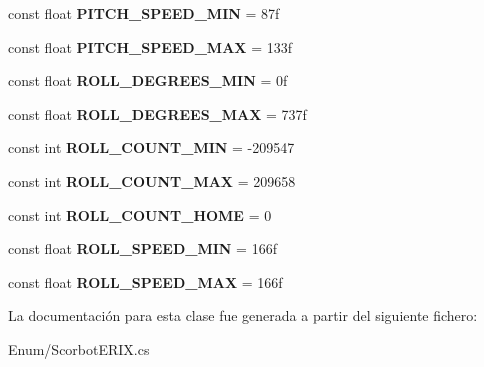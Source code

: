 \begin{DoxyCompactItemize}
const float {\bfseries P\+I\+T\+C\+H\+\_\+\+S\+P\+E\+E\+D\+\_\+\+M\+IN} = 87f
\item 
\mbox{\label{class_scorbot_e_r_i_x_a5ca94c84b6cd6544a714c421b3aba5fb}} 
const float {\bfseries P\+I\+T\+C\+H\+\_\+\+S\+P\+E\+E\+D\+\_\+\+M\+AX} = 133f
\item 
\mbox{\label{class_scorbot_e_r_i_x_accf0e376abade49acc20a535de2f1c8f}} 
const float {\bfseries R\+O\+L\+L\+\_\+\+D\+E\+G\+R\+E\+E\+S\+\_\+\+M\+IN} = 0f
\item 
\mbox{\label{class_scorbot_e_r_i_x_a57eb1a952954a936ef9c3c9032762078}} 
const float {\bfseries R\+O\+L\+L\+\_\+\+D\+E\+G\+R\+E\+E\+S\+\_\+\+M\+AX} = 737f
\item 
\mbox{\label{class_scorbot_e_r_i_x_aa8eafd3a427f306fceaa8a251f46ca8f}} 
const int {\bfseries R\+O\+L\+L\+\_\+\+C\+O\+U\+N\+T\+\_\+\+M\+IN} = -\/209547
\item 
\mbox{\label{class_scorbot_e_r_i_x_a2e0e51d09505d42702c453484ee4b87e}} 
const int {\bfseries R\+O\+L\+L\+\_\+\+C\+O\+U\+N\+T\+\_\+\+M\+AX} = 209658
\item 
\mbox{\label{class_scorbot_e_r_i_x_a409cfc91d430fcfd55de2436cd6e2358}} 
const int {\bfseries R\+O\+L\+L\+\_\+\+C\+O\+U\+N\+T\+\_\+\+H\+O\+ME} = 0
\item 
\mbox{\label{class_scorbot_e_r_i_x_a1c5595b243018690f9e9208e8c850ba3}} 
const float {\bfseries R\+O\+L\+L\+\_\+\+S\+P\+E\+E\+D\+\_\+\+M\+IN} = 166f
\item 
\mbox{\label{class_scorbot_e_r_i_x_a0b7d9288b3dbb63dc616b588403e2e96}} 
const float {\bfseries R\+O\+L\+L\+\_\+\+S\+P\+E\+E\+D\+\_\+\+M\+AX} = 166f
\end{DoxyCompactItemize}


La documentación para esta clase fue generada a partir del siguiente fichero\+:\begin{DoxyCompactItemize}
\item 
Enum/Scorbot\+E\+R\+I\+X.\+cs\end{DoxyCompactItemize}
